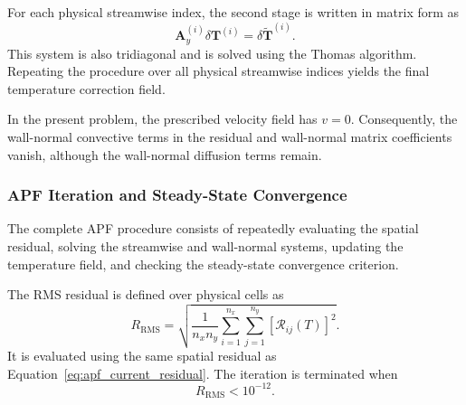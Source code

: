 For each physical streamwise index, the second stage is
written in matrix form as
\begin{equation}
\boxed{
\mathbf{A}_y^{(i)}
\delta\mathbf{T}^{(i)}
=
\delta\widetilde{\mathbf{T}}^{(i)}.
}
\label{eq:apf_y_matrix_system}
\end{equation}
This system is also tridiagonal and is solved using the
Thomas algorithm. Repeating the procedure over all physical
streamwise indices yields the final temperature correction
field.

In the present problem, the prescribed velocity field has
$v=0$. Consequently, the wall-normal convective terms in
the residual and wall-normal matrix coefficients vanish,
although the wall-normal diffusion terms remain.

\subsubsection{APF Iteration and Steady-State Convergence}

The complete APF procedure consists of repeatedly evaluating
the spatial residual, solving the streamwise and wall-normal
systems, updating the temperature field, and checking the
steady-state convergence criterion.

The RMS residual is defined over physical cells as
\begin{equation}
\boxed{
R_{\mathrm{RMS}}
=
\sqrt{
\frac{1}{n_xn_y}
\sum_{i=1}^{n_x}
\sum_{j=1}^{n_y}
\left[\mathcal{R}_{ij}(T)\right]^2
}.
}
\label{eq:apf_convergence_residual}
\end{equation}
It is evaluated using the same spatial residual as
Equation~\eqref{eq:apf_current_residual}. The iteration is
terminated when
\begin{equation}
\boxed{
R_{\mathrm{RMS}}<10^{-12}.
}
\label{eq:apf_convergence_criterion}
\end{equation}

